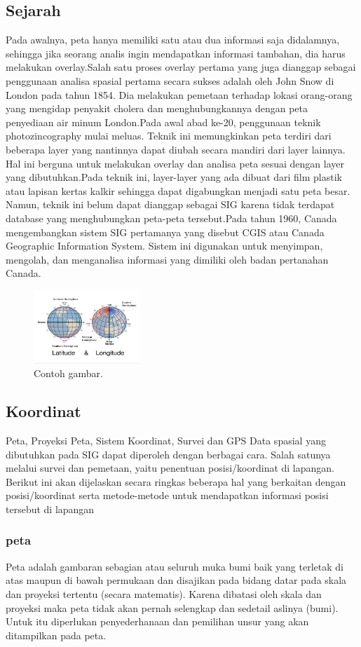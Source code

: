 \subsection{Sejarah}
Pada awalnya, peta hanya memiliki satu atau dua informasi saja didalamnya, sehingga jika seorang analis ingin mendapatkan informasi tambahan, dia harus melakukan overlay.Salah satu proses overlay pertama yang juga dianggap sebagai penggunaan analisa spasial pertama secara sukses adalah oleh John Snow di London pada tahun 1854. Dia melakukan pemetaan terhadap lokasi orang-orang yang mengidap penyakit cholera dan menghubungkannya dengan peta penyediaan air minum London.Pada awal abad ke-20, penggunaan teknik photozincography mulai meluas. Teknik ini memungkinkan peta terdiri dari beberapa layer yang nantinnya dapat diubah secara mandiri dari layer lainnya. Hal ini berguna untuk melakukan overlay dan analisa peta sesuai dengan layer yang dibutuhkan.Pada teknik ini, layer-layer yang ada dibuat dari film plastik atau lapisan kertas kalkir sehingga dapat digabungkan menjadi satu peta besar. Namun, teknik ini belum dapat dianggap sebagai SIG karena tidak terdapat database yang menghubungkan peta-peta tersebut.Pada tahun 1960, Canada mengembangkan sistem SIG pertamanya yang disebut CGIS atau Canada Geographic Information System. Sistem ini digunakan untuk menyimpan, mengolah, dan menganalisa informasi yang dimiliki oleh badan pertanahan Canada.
\begin{figure}[H]
	\includegraphics[width=4cm]{figures/1174017/gis2.JPG}
	\centering
	\caption{Contoh gambar.}
\end{figure}
\subsection{Koordinat}
Peta, Proyeksi Peta, Sistem Koordinat, Survei dan GPS 
   Data spasial yang dibutuhkan pada SIG dapat diperoleh dengan berbagai cara. Salah satunya melalui survei dan pemetaan, yaitu penentuan posisi/koordinat di lapangan. Berikut ini akan dijelaskan secara ringkas beberapa hal yang berkaitan dengan posisi/koordinat serta metode-metode untuk mendapatkan informasi posisi tersebut di lapangan
\subsubsection{peta}
Peta adalah gambaran sebagian atau seluruh muka bumi baik yang terletak di atas maupun di bawah permukaan dan disajikan pada bidang datar pada skala dan proyeksi tertentu (secara matematis). Karena dibatasi oleh skala dan proyeksi maka peta tidak akan pernah selengkap dan sedetail aslinya (bumi). Untuk itu diperlukan penyederhanaan dan pemilihan unsur yang akan ditampilkan pada peta.
